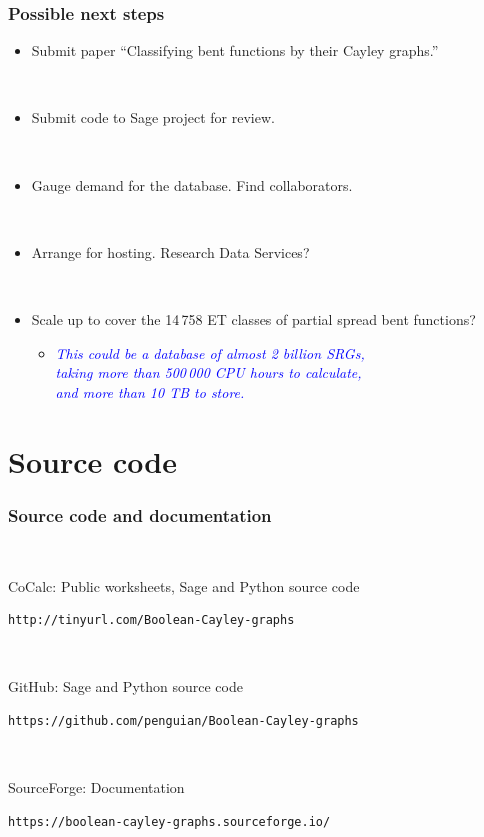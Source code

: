 \documentclass[pdf,sprung,slideColor,nocolorBG]{beamer}
\newenvironment{colortheme}[1]{
\def\ProvidesPackageRCS $##1${\relax}
\renewcommand{\ProcessOptions}{\relax}
\makeatletter

\makeatother
}{}
\newcommand{\Emph}[1]{\emph{\textcolor{blue}{#1}}}
\begin{document}
\begin{colortheme}{jubata}

\begin{frame}[fragile]
\frametitle{Possible next steps}

\begin{itemize}
 \item
Submit paper ``Classifying bent functions by their Cayley graphs.''

~

 \item
Submit code to Sage project for review.

~

 \item
Gauge demand for the database. Find collaborators.

~

 \item
Arrange for hosting. Research Data Services?

~

 \item
Scale up to cover the 14\,758 ET classes of partial spread bent functions?

 \begin{itemize}
  \item
\Emph{This could be a database of almost 2 billion SRGs,
\\
taking more than 500\,000 CPU hours to calculate,
\\
and more than 10 TB to store.}
 \end{itemize}
\end{itemize}
\end{frame}

\end{colortheme}

\section{Source code}

\begin{colortheme}{jubata}

\begin{frame}[fragile]
\frametitle{Source code and documentation}
~

CoCalc: Public worksheets, Sage and Python source code

\begin{verbatim}
http://tinyurl.com/Boolean-Cayley-graphs
\end{verbatim}

~

GitHub: Sage and Python source code

\begin{verbatim}
https://github.com/penguian/Boolean-Cayley-graphs
\end{verbatim}

~

SourceForge: Documentation

\begin{verbatim}
https://boolean-cayley-graphs.sourceforge.io/
\end{verbatim}
\end{frame}

\end{colortheme}
\end{document}

